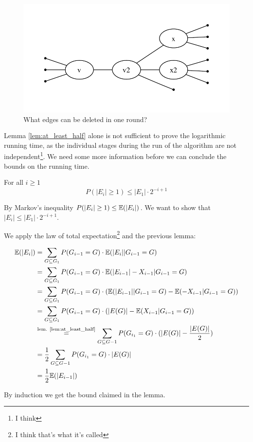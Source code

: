 \begin{pr}
\begin{figure}
\begin{center}
\includegraphics{./images/randomized_matching_delete_edge}
\end{center}
\caption{What edges can be deleted in one round?}
\label{fig:at_least_half}
\end{figure}
\end{pr}

Lemma \ref{lem:at_least_half} alone is not sufficient to prove the logarithmic running time, as the individual stages during the run of the algorithm are not independent\footnote{I think}. We need some more information before we can conclude the bounds on the running time.

\begin{lem} For all $i\geq 1$
\[P(|E_i| \geq 1) \leq |E_1| \cdot 2^{-i+1}\]
\end{lem}

\begin{pr} By Markov's inequality $P(|E_i| \geq 1) \leq \mathbb{E}(|E_i|)$. We want to show that $|E_i|\leq |E_1|\cdot 2^{-i+1}$.

We apply the law of total expectation\footnote{I think that's what it's called} and the previous lemma:

\begin{align*}
\mathbb{E}(|E_i|) &= \sum_{G\subseteq G_1} P(G_{i-1} =G) \cdot \mathbb{E}(|E_i| | G_{i-1}=G)\\
	&=\sum_{G\subseteq G_1}  P(G_{i-1} =G) \cdot \mathbb{E}(|E_{i-1}| -X_{i-1} | G_{i-1}=G)\\
	&=\sum_{G\subseteq G_1}  P(G_{i-1} =G) \cdot (\mathbb{E}(|E_{i-1}| | G_{i-1}=G) - \mathbb{E}( -X_{i-1} | G_{i-1}=G))\\
	&=\sum_{G\subseteq G_1}  P(G_{i-1} =G) \cdot (|E(G)| - \mathbb{E}(X_{i-1} | G_{i-1}=G))\\
	&\stackrel{\text{lem. \ref{lem:at_least_half}}}{=} \sum_{G\subseteq G-1}  P(G_{i_1} =G) \cdot (|E(G)| - \frac{|E(G)|}{2})\\
	&=\frac 12 \sum_{G\subseteq G-1}  P(G_{i_1} =G) \cdot |E(G)|\\
	&=\frac 12 \mathbb{E}(|E_{i-1}|)\\
\end{align*}

By induction we get the bound claimed in the lemma.
\end{pr}


